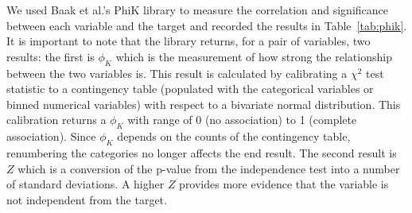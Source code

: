 \documentclass{ieeeaccess}
\begin{document}
We used Baak et al.'s PhiK library to measure the correlation and significance between each variable and the target and recorded the results in Table~\ref{tab:phik}. It is important to note that the library returns, for a pair of variables, two results: the first is $\phi_{K}$ which is the measurement of how strong the relationship between the two variables is. This result is calculated by calibrating a $\chi^2$ test statistic to a contingency table (populated with the categorical variables or binned numerical variables) with respect to a bivariate normal distribution. This calibration returns a $\phi_{K}$ with range of 0 (no association) to 1 (complete association). Since $\phi_{K}$ depends on the counts of the contingency table, renumbering the categories no longer affects the end result. The second result is $Z$ which is a conversion of the p-value from the independence test into a number of standard deviations. A higher $Z$ provides more evidence that the variable is not independent from the target.
\end{document}
